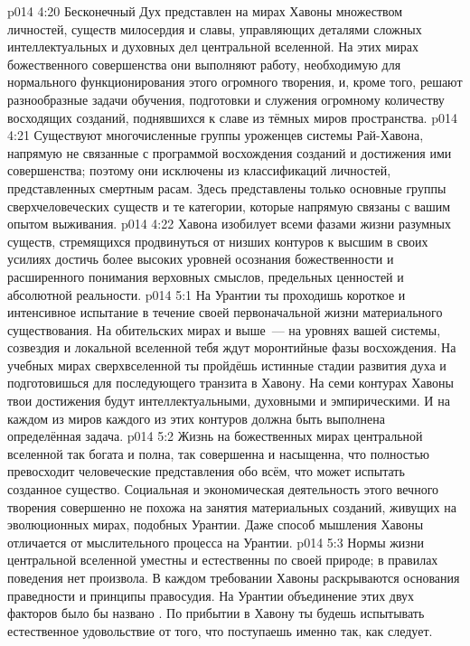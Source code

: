 \vs p014 4:20 Бесконечный Дух представлен на мирах Хавоны множеством личностей, существ милосердия и славы, управляющих деталями сложных интеллектуальных и духовных дел центральной вселенной. На этих мирах божественного совершенства они выполняют работу, необходимую для нормального функционирования этого огромного творения, и, кроме того, решают разнообразные задачи обучения, подготовки и служения огромному количеству восходящих созданий, поднявшихся к славе из тёмных миров пространства.
\vs p014 4:21 Существуют многочисленные группы уроженцев системы Рай\hyp{}Хавона, напрямую не связанные с программой восхождения созданий и достижения ими совершенства; поэтому они исключены из классификаций личностей, представленных смертным расам. Здесь представлены только основные группы сверхчеловеческих существ и те категории, которые напрямую связаны с вашим опытом выживания.
\vs p014 4:22 Хавона изобилует всеми фазами жизни разумных существ, стремящихся продвинуться от низших контуров к высшим в своих усилиях достичь более высоких уровней осознания божественности и расширенного понимания верховных смыслов, предельных ценностей и абсолютной реальности.
\vs p014 5:1 На Урантии ты проходишь короткое и интенсивное испытание в течение своей первоначальной жизни материального существования. На обительских мирах и выше~--- на уровнях вашей системы, созвездия и локальной вселенной тебя ждут моронтийные фазы восхождения. На учебных мирах сверхвселенной ты пройдёшь истинные стадии развития духа и подготовишься для последующего транзита в Хавону. На семи контурах Хавоны твои достижения будут интеллектуальными, духовными и эмпирическими. И на каждом из миров каждого из этих контуров должна быть выполнена определённая задача.
\vs p014 5:2 Жизнь на божественных мирах центральной вселенной так богата и полна, так совершенна и насыщенна, что полностью превосходит человеческие представления обо всём, что может испытать созданное существо. Социальная и экономическая деятельность этого вечного творения совершенно не похожа на занятия материальных созданий, живущих на эволюционных мирах, подобных Урантии. Даже способ мышления Хавоны отличается от мыслительного процесса на Урантии.
\vs p014 5:3 Нормы жизни центральной вселенной уместны и естественны по своей природе; в правилах поведения нет произвола. В каждом требовании Хавоны раскрываются основания праведности и принципы правосудия. На Урантии объединение этих двух факторов было бы названо . По прибытии в Хавону ты будешь испытывать естественное удовольствие от того, что поступаешь именно так, как следует.
